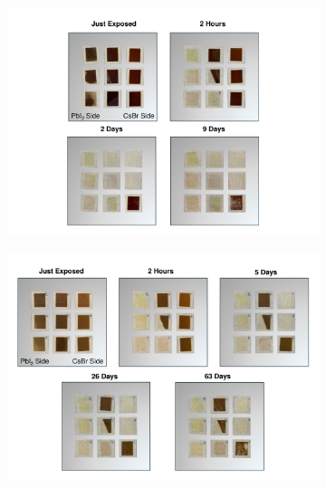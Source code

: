 \begin{figure}[htbp]
    \centering
    \begin{subfigure}[t]{0.99\textwidth}
        \centering
        \includegraphics[width=\textwidth]{chapters/stability/imeges/Stability - No Rotation_275nm_on_glass.pdf} %
                
    \end{subfigure}

    \caption{}
    \label{}
\end{figure}



\begin{figure}[htbp]
    \centering
    \begin{subfigure}[t]{0.99\textwidth}
        \centering
        \includegraphics[width=\textwidth]{chapters/stability/imeges/Stability_No_Rotation_139nm_on_glass.pdf} %
    \end{subfigure}

    \caption{}
    \label{}
\end{figure}

